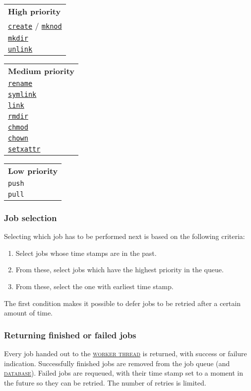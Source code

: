 \documentclass[a4paper]{article}
\newcommand{\keyword}[1]{\hyperref[keyword:#1]{\textsc{#1}}\xspace}
\newcommand{\jobtype}[1]{\texttt{#1}\xspace}
\newcommand{\push}{\jobtype{push}}
\newcommand{\pull}{\jobtype{pull}}
\newcommand{\database}{\keyword{database}}
\newcommand{\workerthread}{\hyperref[keyword:workerthread]{\textsc{worker thread}}\xspace}
\newcommand{\fsopref}[1]{\hyperref[fsop:#1]{\texttt{#1}}}
\begin{document}
\begin{multicols}{3}

\begin{tabular}{l}
	\textbf{High priority} \\
	\fsopref{create} / \fsopref{mknod} \\
	\fsopref{mkdir} \\
	\fsopref{unlink} \\
\end{tabular}

\vfill
\columnbreak
\begin{tabular}{l}
	\textbf{Medium priority} \\
	\fsopref{rename} \\
	\fsopref{symlink} \\
	\fsopref{link} \\
	\fsopref{rmdir} \\
	\fsopref{chmod} \\
	\fsopref{chown} \\
	\fsopref{setxattr} \\
\end{tabular}

\vfill
\columnbreak
\begin{tabular}{l}
\textbf{Low priority} \\
	\push \\
	\pull \\
\end{tabular}
\end{multicols}


\subsubsection{Job selection}
Selecting which job has to be performed next is based on the following criteria:

\begin{enumerate}
		\item Select jobs whose time stamps are in the past.
		\item From these, select jobs which have the highest priority in the queue.
		\item From these, select the one with earliest time stamp.
\end{enumerate}

The first condition makes it possible to defer jobs to be retried after a
certain amount of time.

\subsubsection{Returning finished or failed jobs}
\label{sec:job_return}
Every job handed out to the \workerthread is returned, with success or failure
indication. Successfully finished jobs are removed from the job queue (and
\database). Failed jobs are requeued, with their time stamp set to a moment in
the future so they can be retried. The number of retries is limited.
\end{document}
